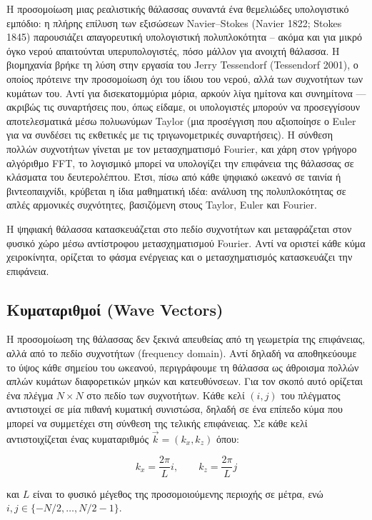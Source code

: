 Η προσομοίωση μιας ρεαλιστικής θάλασσας συναντά ένα θεμελιώδες
υπολογιστικό εμπόδιο: η πλήρης επίλυση των εξισώσεων Navier--Stokes
(Navier 1822; Stokes 1845) παρουσιάζει απαγορευτική υπολογιστική
πολυπλοκότητα -- ακόμα και για μικρό όγκο νερού απαιτούνται
υπερυπολογιστές, πόσο μάλλον για ανοιχτή θάλασσα. Η βιομηχανία βρήκε τη
λύση στην εργασία του Jerry Tessendorf (Tessendorf 2001), ο οποίος
πρότεινε την προσομοίωση όχι του ίδιου του νερού, αλλά των συχνοτήτων
των κυμάτων του. Αντί για δισεκατομμύρια μόρια, αρκούν λίγα ημίτονα και
συνημίτονα --- ακριβώς τις συναρτήσεις που, όπως είδαμε, οι υπολογιστές
μπορούν να προσεγγίσουν αποτελεσματικά μέσω πολυωνύμων Taylor (μια
προσέγγιση που αξιοποίησε ο Euler για να συνδέσει τις εκθετικές με τις
τριγωνομετρικές συναρτήσεις). Η σύνθεση πολλών συχνοτήτων γίνεται με τον
μετασχηματισμό Fourier, και χάρη στον γρήγορο αλγόριθμο FFT, το
λογισμικό μπορεί να υπολογίζει την επιφάνεια της θάλασσας σε κλάσματα
του δευτερολέπτου. Έτσι, πίσω από κάθε ψηφιακό ωκεανό σε ταινία ή
βιντεοπαιχνίδι, κρύβεται η ίδια μαθηματική ιδέα: ανάλυση της
πολυπλοκότητας σε απλές αρμονικές συχνότητες, βασιζόμενη στους Taylor,
Euler και Fourier.

Η ψηφιακή θάλασσα κατασκευάζεται στο πεδίο συχνοτήτων και μεταφράζεται
στον φυσικό χώρο μέσω αντίστροφου μετασχηματισμού Fourier. Αντί να
οριστεί κάθε κύμα χειροκίνητα, ορίζεται το φάσμα ενέργειας και ο
μετασχηματισμός κατασκευάζει την επιφάνεια.

\subsection{Κυματαριθμοί (Wave
Vectors)}\label{ux3baux3c5ux3bcux3b1ux3c4ux3b1ux3c1ux3b9ux3b8ux3bcux3bfux3af-wave-vectors}

Η προσομοίωση της θάλασσας δεν ξεκινά απευθείας από τη γεωμετρία της
επιφάνειας, αλλά από το πεδίο συχνοτήτων (frequency domain). Αντί δηλαδή
να αποθηκεύουμε το ύψος κάθε σημείου του ωκεανού, περιγράφουμε τη
θάλασσα ως άθροισμα πολλών απλών κυμάτων διαφορετικών μηκών και
κατευθύνσεων. Για τον σκοπό αυτό ορίζεται ένα πλέγμα \(N \times N\) στο
πεδίο των συχνοτήτων. Κάθε κελί \((i,j)\) του πλέγματος αντιστοιχεί σε
μία πιθανή κυματική συνιστώσα, δηλαδή σε ένα επίπεδο κύμα που μπορεί να
συμμετέχει στη σύνθεση της τελικής επιφάνειας. Σε κάθε κελί
αντιστοιχίζεται ένας κυματαριθμός \(\vec{k} = (k_x, k_z)\) όπου:

\[
k_x = \frac{2\pi}{L}i,
\qquad
k_z = \frac{2\pi}{L}j
\]

και \(L\) είναι το φυσικό μέγεθος της προσομοιούμενης περιοχής σε μέτρα,
ενώ \(i,j \in \{-N/2,\dots,N/2-1\}\).

